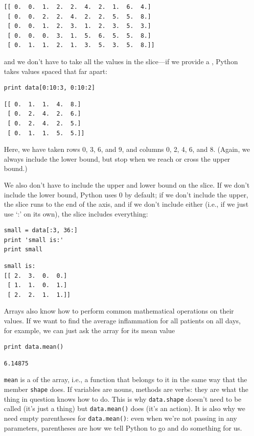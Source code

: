 \documentclass{book}
\begin{document}
\begin{verbatim}
[[ 0.  0.  1.  2.  2.  4.  2.  1.  6.  4.]
 [ 0.  0.  2.  2.  4.  2.  2.  5.  5.  8.]
 [ 0.  0.  1.  2.  3.  1.  2.  3.  5.  3.]
 [ 0.  0.  0.  3.  1.  5.  6.  5.  5.  8.]
 [ 0.  1.  1.  2.  1.  3.  5.  3.  5.  8.]]
\end{verbatim}

and we don't have to take all the values in the slice---if we provide a
, Python takes values spaced that far apart:

\begin{verbatim}
print data[0:10:3, 0:10:2]
\end{verbatim}

\begin{verbatim}
[[ 0.  1.  1.  4.  8.]
 [ 0.  2.  4.  2.  6.]
 [ 0.  2.  4.  2.  5.]
 [ 0.  1.  1.  5.  5.]]
\end{verbatim}

Here, we have taken rows 0, 3, 6, and 9, and columns 0, 2, 4, 6, and 8.
(Again, we always include the lower bound, but stop when we reach or
cross the upper bound.)

We also don't have to include the upper and lower bound on the slice. If
we don't include the lower bound, Python uses 0 by default; if we don't
include the upper, the slice runs to the end of the axis, and if we
don't include either (i.e., if we just use `:' on its own), the slice
includes everything:

\begin{verbatim}
small = data[:3, 36:]
print 'small is:'
print small
\end{verbatim}

\begin{verbatim}
small is:
[[ 2.  3.  0.  0.]
 [ 1.  1.  0.  1.]
 [ 2.  2.  1.  1.]]
\end{verbatim}

Arrays also know how to perform common mathematical operations on their
values. If we want to find the average inflammation for all patients on
all days, for example, we can just ask the array for its mean value

\begin{verbatim}
print data.mean()
\end{verbatim}

\begin{verbatim}
6.14875
\end{verbatim}

\texttt{mean} is a  of the array, i.e., a
function that belongs to it in the same way that the member
\texttt{shape} does. If variables are nouns, methods are verbs: they are
what the thing in question knows how to do. This is why
\texttt{data.shape} doesn't need to be called (it's just a thing) but
\texttt{data.mean()} does (it's an action). It is also why we need empty
parentheses for \texttt{data.mean()}: even when we're not passing in any
parameters, parentheses are how we tell Python to go and do something
for us.
\end{document}
